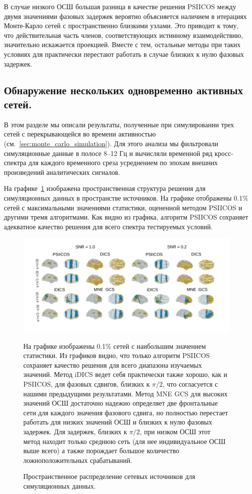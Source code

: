В случае низкого ОСШ большая разница в качестве решения PSIICOS между двумя
значениями фазовых задержек вероятно объясняется наличием в итерациях
Монте-Карло сетей с пространственно близкими узлами. Это приводит к тому, что
действительная часть членов, соответствующих истинному взаимодействию,
значительно искажается проекцией. Вместе с тем, остальные методы при таких
условиях для практически перестают работать в случае близких к нулю фазовых задержек.

\subsection{Обнаружение нескольких одновременно активных сетей.}

В этом разделе мы описали результаты, полученные при симулировании трех сетей с
перекрывающейся во времени активностью (см.~\ref{sec:monte_carlo_simulation}).
Для этого анализа мы фильтровали симуляционные данные в полосе 8--12 Гц и
вычисляли временной ряд кросс-спектра для каждого временного среза усреднением
по эпохам внешних произведений аналитических сигналов.

На графике~\ref{fig:05} изображена пространственная структура решения для
симуляционных данных в пространстве источников. На графике отображены 0.1\% сетей
с максимальными значениями статистики, оцененной методом PSIICOS и другими тремя
алгоритмами. Как видно из графика, алгоритм PSIICOS сохраняет адекватное качество решения
для всего спектра тестируемых условий.

\begin{figure}[!ht]
 \includegraphics[width=1\textwidth]{../images/psiicos_paper/Figure5_hr.jpg}
 \caption{Пространственное распределение сетевых источников для симуляционных данных.}\label{fig:05} %
     На графике изображены 0.1\% сетей с наибольшим значением
     статистики. Из графиков видно, что только алгоритм PSIICOS сохраняет
     качество решения для всего диапазона изучаемых значений.
     Метод iDICS ведет себя практически также хорошо, как и PSIICOS,
     для фазовых сдвигов, близких к $\pi/2$, что согласуется с нашими предыдущими
     результатами. Метод MNE GCS для высоких значений ОСШ достаточно надежно определяет
     две фронтальные сети для каждого значения фазового сдвига, но полностью перестает
     работать для низких значений ОСШ и близких к нулю фазовых задержек. Для задержек,
     близких к $\pi/2$, при низком ОСШ этот метод находит только среднюю сеть
     (для нее индивидуальное ОСШ выше всего) а также порождает большое количество
     ложноположительных срабатываний.
\end{figure}%

